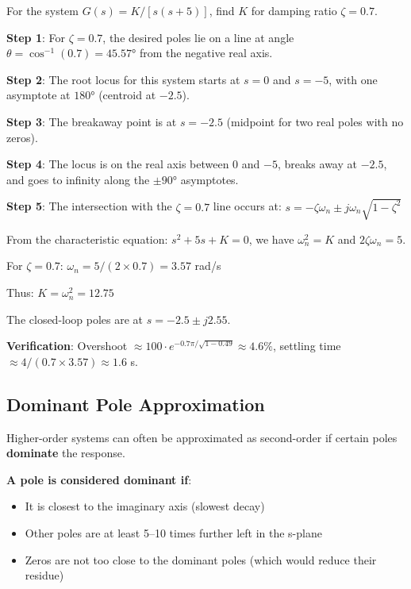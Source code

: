 \begin{example}
\label{ex:gain_selection}
For the system $G(s) = K/[s(s+5)]$, find $K$ for damping ratio $\zeta = 0.7$.

\textbf{Step 1}: For $\zeta = 0.7$, the desired poles lie on a line at angle $\theta = \cos^{-1}(0.7) = 45.57°$ from the negative real axis.

\textbf{Step 2}: The root locus for this system starts at $s = 0$ and $s = -5$, with one asymptote at $180°$ (centroid at $-2.5$).

\textbf{Step 3}: The breakaway point is at $s = -2.5$ (midpoint for two real poles with no zeros).

\textbf{Step 4}: The locus is on the real axis between 0 and $-5$, breaks away at $-2.5$, and goes to infinity along the $\pm 90°$ asymptotes.

\textbf{Step 5}: The intersection with the $\zeta = 0.7$ line occurs at:
$s = -\zeta\omega_n \pm j\omega_n\sqrt{1-\zeta^2}$

From the characteristic equation: $s^2 + 5s + K = 0$, we have $\omega_n^2 = K$ and $2\zeta\omega_n = 5$.

For $\zeta = 0.7$: $\omega_n = 5/(2 \times 0.7) = 3.57$ rad/s

Thus: $K = \omega_n^2 = 12.75$

The closed-loop poles are at $s = -2.5 \pm j2.55$.

\textbf{Verification}: Overshoot $\approx 100 \cdot e^{-0.7\pi/\sqrt{1-0.49}} \approx 4.6\%$, settling time $\approx 4/(0.7 \times 3.57) \approx 1.6$ s.
\end{example}

\subsection{Dominant Pole Approximation}
\label{subsec:dominant_pole}

Higher-order systems can often be approximated as second-order if certain poles \textbf{dominate} the response.

\textbf{A pole is considered dominant if}:
\begin{itemize}
    \item It is closest to the imaginary axis (slowest decay)
    \item Other poles are at least 5--10 times further left in the s-plane
    \item Zeros are not too close to the dominant poles (which would reduce their residue)
\end{itemize}


